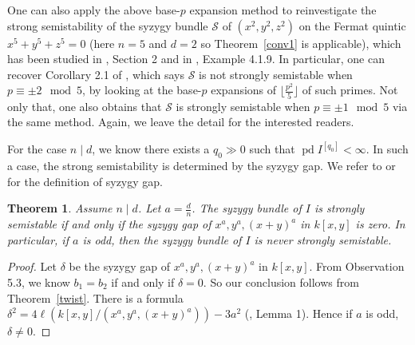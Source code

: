 \documentclass[draft]{amsart}
\newtheorem{theorem}{Theorem}[section]
\theoremstyle{definition}
\numberwithin{equation}{theorem}
\begin{document}
One can also apply the above base-$p$ expansion method to reinvestigate the strong semistability of the syzygy bundle ${\mathcal{S}}$ of $(x^2,y^2,z^2)$ on the Fermat quintic $x^5+y^5+z^5=0$ (here $n=5$ and $d=2$ so Theorem~\ref{conv1} is applicable), which has been studied in \cite{B5}, Section 2 and in \cite{K}, Example 4.1.9. In particular, one can recover Corollary 2.1 of \cite{B5}, which says ${\mathcal{S}}$ is not strongly semistable when $p \equiv \pm 2 \mod 5$, by looking at the base-$p$ expansions of ${{\lfloor}} \frac{p^2}{5} {{\rfloor}}$ of such primes. Not only that, one also obtains that ${\mathcal{S}}$ is strongly semistable when $p \equiv \pm 1 \mod 5$ via the same method. Again, we leave the detail for the interested readers.

For the case $n \mid d$, we know there exists a $q_0\gg0$ such that  ${\mathop{\mathrm{pd}}\nolimits} I^{[q_0]} < {{\infty}}$. In such a case, the strong semistability is determined by the syzygy gap. We refer to \cite{M3} or \cite{BK} for the definition of syzygy gap.
\begin{theorem}\label{conv2}
Assume $n \mid d$. Let $a=\frac{d}{n}$. The syzygy bundle of $I$ is strongly semistable if and only if the syzygy gap of $x^a,y^a,(x+y)^a$ in $k[x,y]$ is zero. In particular, if $a$ is odd, then the syzygy bundle of $I$ is never strongly semistable.
\end{theorem}
\begin{proof}
Let $\delta$ be the syzygy gap of $x^a,y^a,(x+y)^a$ in $k[x,y]$. 
From \cite{KRV} Observation 5.3, we know $b_1 = b_2$ if and only if $\delta=0$. So our conclusion follows from Theorem~\ref{twist}. There is a formula $\delta^2=4{\ell}(k[x,y]/(x^a,y^a,(x+y)^a))-3a^2$ (\cite{M3}, Lemma 1). Hence if $a$ is odd, $\delta \neq 0$.
\end{proof}
\end{document}

